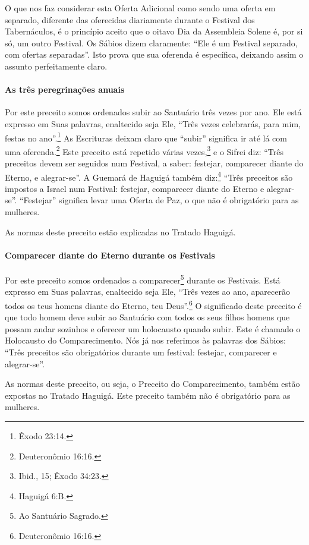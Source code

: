 O que nos faz considerar esta Oferta Adicional como sendo uma oferta em
separado, diferente das oferecidas diariamente durante o Festival dos
Tabernáculos, é o princípio aceito que o oitavo Dia da Assembleia Solene
é, por si só, um outro Festival. Os Sábios dizem claramente: ``Ele é um
Festival separado, com ofertas separadas''. Isto prova que sua oferenda
é específica, deixando assim o assunto perfeitamente claro.

\paragraph{As três peregrinações anuais}

Por este preceito somos ordenados subir ao Santuário três vezes por ano.
Ele está expresso em Suas palavras, enaltecido seja Ele, ``Três vezes
celebrarás, para mim, festas no ano''.\footnote{Êxodo 23:14.} As Escrituras deixam
claro que ``subir'' significa ir até lá com uma oferenda.\footnote{Deuteronômio 16:16.}
Este preceito está repetido várias vezes,\footnote{Ibid., 15; Êxodo 34:23.} e o
Sifrei diz: ``Três preceitos devem ser seguidos num Festival, a saber: festejar, comparecer diante do Eterno, e alegrar-se''. A Guemará
de Haguigá também diz:\footnote{Haguigá 6:B.} ``Três preceitos são
impostos a Israel num Festival: festejar, comparecer diante do Eterno e alegrar-se''. ``Festejar'' significa levar uma Oferta de Paz, o que não é obrigatório para as
mulheres.

As normas deste preceito estão explicadas no Tratado Haguigá.


\paragraph{Comparecer diante do Eterno durante os Festivais}

Por este preceito somos ordenados a comparecer\footnote{Ao Santuário Sagrado.}
durante os Festivais. Está expresso em Suas palavras, enaltecido seja
Ele, ``Três vezes ao ano, aparecerão todos os teus homens diante do
Eterno, teu Deus''.\footnote{Deuteronômio 16:16.} O significado deste preceito é
que todo homem deve subir ao Santuário com todos os seus filhos homens
que possam andar sozinhos e oferecer um holocausto quando subir. Este é
chamado o Holocausto do Comparecimento. Nós já nos referimos às palavras
dos Sábios: ``Três preceitos são obrigatórios durante um festival:
festejar, comparecer e alegrar-se''.

As normas deste preceito, ou seja, o Preceito do Comparecimento, também
estão expostas no Tratado Haguigá. Este preceito também não é
obrigatório para as mulheres.

